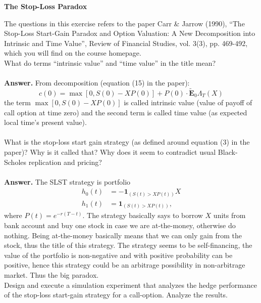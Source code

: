\documentclass[a4paper]{article}
\begin{document}
\setlength\parindent{0pt}

{\Large{\textbf{The Stop-Loss Paradox}}}\\
\vspace{0.2cm}

The questions in this exercise refers to the paper Carr \& Jarrow (1990), ``The Stop-Loss Start-Gain Paradox and Option Valuation: A New Decomposition into Intrinsic and Time Value'', Review of Financial Studies, vol. 3(3), pp. 469-492, which you will find on the course homepage. \\

What do terms ``intrinsic value'' and ``time value'' in the title mean? \\
\\
\textbf{Answer.} From decomposition (equation (15) in the paper):
$$
c(0)=\max[0,S(0)-XP(0)]+P(0)\cdot \tilde{\mathbf{E}}_0\Lambda_T(X)
$$
the term $\max[0,S(0)-XP(0)]$ is called intrinsic value (value of payoff of call option at time zero) and the second term is called time value (as expected local time's present value).\\
\\

What is the stop-loss start gain strategy (as defined around equation (3) in the paper)? Why is it called that? Why does it seem to contradict usual Black-Scholes replication and pricing?\\
\\
\textbf{Answer.} The SLST strategy is portfolio
\begin{align*}
h_0(t) &= -\textbf{1}_{(S(t)>XP(t))}X\\
h_1(t) &= \textbf{1}_{(S(t)>XP(t))},
\end{align*}
where $P(t)=e^{-r(T-t)}.$ The strategy basically says to borrow $X$ units from bank account and buy one stock in case we are at-the-money, otherwise do nothing. Being at-the-money basically means that we can only gain from the stock, thus the title of this strategy. The strategy seems to be self-financing, the value of the portfolio is non-negative and with positive probability can be positive, hence this strategy could be an arbitrage possibility in non-arbitrage market. Thus the big paradox.\\

\vspace{0.2cm}
Design and execute a simulation experiment that analyzes the hedge performance of the stop-loss start-gain strategy for a call-option. Analyze the results. \\
\end{document}
